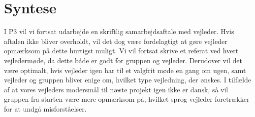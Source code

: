 \section{Syntese}
I P$3$ vil vi fortsat udarbejde en skriftlig samarbejdsaftale med vejleder. Hvis aftalen ikke bliver overholdt, vil det dog være fordelagtigt at gøre vejleder opmærksom på dette hurtigst muligt. Vi vil fortsat skrive et referat ved hvert vejledermøde, da dette både er godt for gruppen og vejleder. Derudover vil det være optimalt, hvis vejleder igen har til et valgfrit møde en gang om ugen, samt vejleder og gruppen bliver enige om, hvilket type vejledning, der ønskes. I tilfælde af at vores vejleders modersmål til næste projekt igen ikke er dansk, så vil gruppen fra starten være mere opmærksom på, hvilket sprog vejleder foretrækker for at undgå misforståelser.